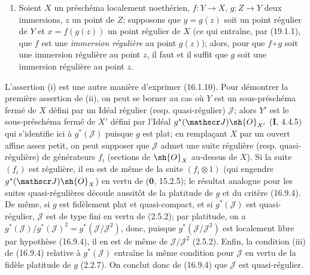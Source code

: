 \begin{proposition}[19.1.5]
\begin{enumerate}
\begin{enumerate}
  \end{enumerate}
  \item[\textup{(v)}] Soient $X$ un préschéma localement noethérien, $f:Y\to X$, $g:Z\to Y$ deux immersions, $z$ un point de $Z$; supposons que $y=g(z)$ soit un point régulier de $Y$ et $x=f(g(z))$ un point régulier
de $X$ \textup{(ce qui entraîne, par (19.1.1), que $f$ est une \emph{immersion régulière} au point $g(z)$)}; alors,
pour que $f\circ g$ soit une immersion régulière au point $z$, il faut et il suffit que $g$ soit une immersion régulière au point $z$.
\end{enumerate}
\end{proposition}

L'assertion (i) est une autre manière d'exprimer (16.1.10). Pour démontrer la première assertion de (ii), on peut se borner au cas où $Y$ est un sous-préschéma fermé de $X$ défini par un Idéal régulier (resp. quasi-régulier) $\mathscr J$; alors $Y'$ est le sous-préschéma fermé de $X'$ défini par l'Idéal $g^*(\mathscr J)\sh{O}_{X'}$ (\textbf{I}, 4.4.5) qui s'identifie ici à $g^*(\mathscr J)$ puisque $g$ est plat; en remplaçant $X$ par un ouvert affine assez petit, on peut supposer que $\mathscr J$ admet une suite régulière (resp. quasi-régulière) de générateurs $f_i$ (sections de $\sh{O}_X$ au-dessus de $X$). Si la suite $(f_i)$ est régulière, il en est de même de la suite $(f_i\otimes1)$ (qui engendre $g^*(\mathscr J)\sh{O}_X$) en vertu de (\textbf{0}, 15.2.5); le résultat analogue pour les suites quasi-régulières découle aussitôt de la platitude de $g$ et du critère (16.9.4). De même, si $g$ est fidèlement plat et quasi-compact, et si $g^*(\mathscr J)$ est quasi-régulier, $\mathscr J$ est de type fini en vertu de (2.5.2); par platitude, on a $g^*(\mathscr J)/g^*(\mathscr J)^2=g^*(\mathscr J/\mathscr J^2)$, donc, puisque $g^*(\mathscr J/\mathscr J^2)$ est localement libre par hypothèse (16.9.4), il en est de même de $\mathscr J/\mathscr J^2$ (2.5.2). Enfin, la condition (iii) de (16.9.4) relative à $g^*(\mathscr J)$ entraîne la même condition pour $\mathscr J$ en vertu de la fidèle platitude de $g$ (2.2.7). On conclut donc de (16.9.4) que $\mathscr J$ est quasi-régulier.

